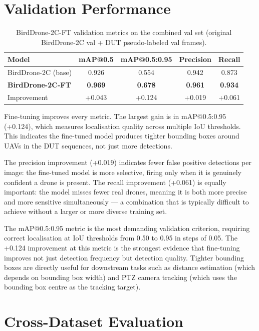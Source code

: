 \documentclass[12pt,a4paper]{report}
\begin{document}
\section{Validation Performance}

\begin{table}[H]
\centering
\caption{BirdDrone-2C-FT validation metrics on the combined val set
(original BirdDrone-2C val + DUT pseudo-labeled val frames).}
\label{tab:val_ft}
\begin{tabular}{|l|c|c|c|c|}
\hline
\textbf{Model} & \textbf{mAP@0.5} & \textbf{mAP@0.5:0.95} & \textbf{Precision} & \textbf{Recall} \\
\hline
BirdDrone-2C (base) & 0.926 & 0.554 & 0.942 & 0.873 \\
\hline
\textbf{BirdDrone-2C-FT} & \textbf{0.969} & \textbf{0.678} & \textbf{0.961} & \textbf{0.934} \\
\hline
Improvement & +0.043 & +0.124 & +0.019 & +0.061 \\
\hline
\end{tabular}
\end{table}

Fine-tuning improves every metric. The largest gain is in mAP@0.5:0.95
(+0.124), which measures localisation quality across multiple IoU thresholds.
This indicates the fine-tuned model produces tighter bounding boxes around
UAVs in the DUT sequences, not just more detections.

The precision improvement (+0.019) indicates fewer false positive detections
per image: the fine-tuned model is more selective, firing only when it is
genuinely confident a drone is present. The recall improvement (+0.061) is
equally important: the model misses fewer real drones, meaning it is both
more precise and more sensitive simultaneously --- a combination that is
typically difficult to achieve without a larger or more diverse training set.

The mAP@0.5:0.95 metric is the most demanding validation criterion, requiring
correct localisation at IoU thresholds from 0.50 to 0.95 in steps of 0.05.
The +0.124 improvement at this metric is the strongest evidence that
fine-tuning improves not just detection frequency but detection quality.
Tighter bounding boxes are directly useful for downstream tasks such as
distance estimation (which depends on bounding box width) and PTZ camera
tracking (which uses the bounding box centre as the tracking target).

\section{Cross-Dataset Evaluation}
\end{document}
